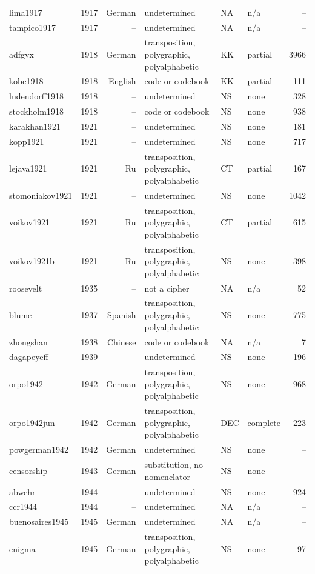 {\begin{longtable}{@{}llrlllr@{}}
lima1917 & 1917 & German & undetermined & NA & n/a & -- \\
tampico1917 & 1917 & -- & undetermined & NA & n/a & -- \\
adfgvx & 1918 & German & transposition, polygraphic, polyalphabetic & KK & partial & 3966 \\
kobe1918 & 1918 & English & code or codebook & KK & partial & 111 \\
ludendorff1918 & 1918 & -- & undetermined & NS & none & 328 \\
stockholm1918 & 1918 & -- & code or codebook & NS & none & 938 \\
karakhan1921 & 1921 & -- & undetermined & NS & none & 181 \\
kopp1921 & 1921 & -- & undetermined & NS & none & 717 \\
lejava1921 & 1921 & Ru & transposition, polygraphic, polyalphabetic & CT & partial & 167 \\
stomoniakov1921 & 1921 & -- & undetermined & NS & none & 1042 \\
voikov1921 & 1921 & Ru & transposition, polygraphic, polyalphabetic & CT & partial & 615 \\
voikov1921b & 1921 & Ru & transposition, polygraphic, polyalphabetic & NS & none & 398 \\
roosevelt & 1935 & -- & not a cipher & NA & n/a & 52 \\
blume & 1937 & Spanish & transposition, polygraphic, polyalphabetic & NS & none & 775 \\
zhongshan & 1938 & Chinese & code or codebook & NA & n/a & 7 \\
dagapeyeff & 1939 & -- & undetermined & NS & none & 196 \\
orpo1942 & 1942 & German & transposition, polygraphic, polyalphabetic & NS & none & 968 \\
orpo1942jun & 1942 & German & transposition, polygraphic, polyalphabetic & DEC & complete & 223 \\
powgerman1942 & 1942 & German & undetermined & NS & none & -- \\
censorship & 1943 & German & substitution, no nomenclator & NS & none & -- \\
abwehr & 1944 & -- & undetermined & NS & none & 924 \\
ccr1944 & 1944 & -- & undetermined & NA & n/a & -- \\
buenosaires1945 & 1945 & German & undetermined & NA & n/a & -- \\
enigma & 1945 & German & transposition, polygraphic, polyalphabetic & NS & none & 97 \\

\end{longtable}}
